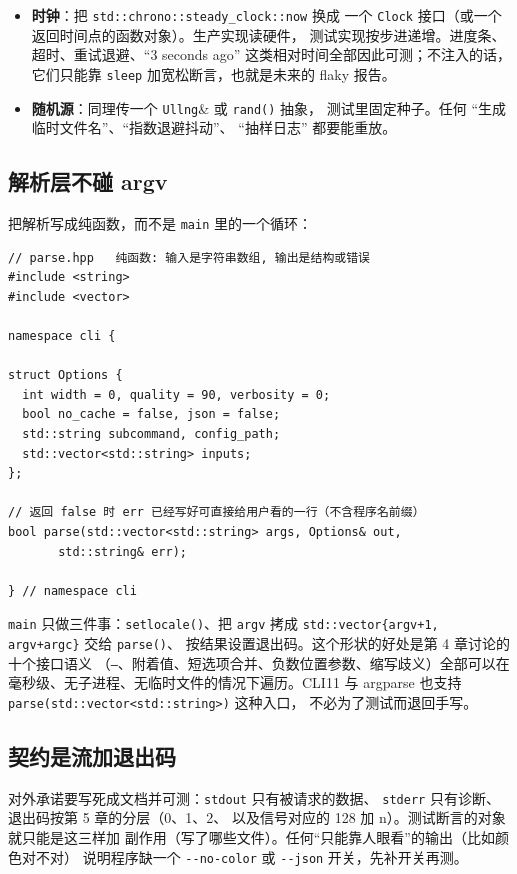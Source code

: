 \documentclass[12pt,a4paper,fontset=fandol]{ctexbook}
\newcommand{\Fn}[1]{\texttt{#1()}}
\newcommand{\Tp}[1]{\texttt{#1}}
\newcommand{\Opt}[1]{\texttt{-\/-#1}}
\newcommand{\Bk}{\allowbreak}
\begin{document}
\begin{itemize}
\item \textbf{时钟}：把 \Tp{std::chrono::steady\Bk\_clock::now} 换成
      一个 \Tp{Clock} 接口（或一个返回时间点的函数对象）。生产实现读硬件，
      测试实现按步进递增。进度条、超时、重试退避、``3 seconds ago''
      这类相对时间全部因此可测；不注入的话，它们只能靠
      \lstinline|sleep| 加宽松断言，也就是未来的 flaky 报告。
\item \textbf{随机源}：同理传一个 \Tp{Ullng}\& 或 \Fn{rand} 抽象，
      测试里固定种子。任何 ``生成临时文件名''、``指数退避抖动''、
      ``抽样日志'' 都要能重放。
\end{itemize}

\subsection{解析层不碰 argv}

把解析写成纯函数，而不是 \Tp{main} 里的一个循环：

\begin{lstlisting}[caption={解析入口的可测形状}]
// parse.hpp   纯函数: 输入是字符串数组, 输出是结构或错误
#include <string>
#include <vector>

namespace cli {

struct Options {
  int width = 0, quality = 90, verbosity = 0;
  bool no_cache = false, json = false;
  std::string subcommand, config_path;
  std::vector<std::string> inputs;
};

// 返回 false 时 err 已经写好可直接给用户看的一行（不含程序名前缀）
bool parse(std::vector<std::string> args, Options& out,
       std::string& err);

} // namespace cli
\end{lstlisting}

\Tp{main} 只做三件事：\Fn{setlocale}、把 \Tp{argv} 拷成
\Tp{std::vector\{argv+1, argv+argc\}} 交给 \Fn{parse}、
按结果设置退出码。这个形状的好处是第 4 章讨论的十个接口语义
（\Tp{--}、附着值、短选项合并、负数位置参数、缩写歧义）全部可以在
毫秒级、无子进程、无临时文件的情况下遍历。CLI11 与 argparse 也支持
\lstinline|parse(std::vector<std::string>)| 这种入口，
不必为了测试而退回手写。

\subsection{契约是流加退出码}

对外承诺要写死成文档并可测：\Tp{stdout} 只有被请求的数据、
\Tp{stderr} 只有诊断、退出码按第 5 章的分层（0、1、2、
以及信号对应的 128 加 n）。测试断言的对象就只能是这三样加
副作用（写了哪些文件）。任何``只能靠人眼看''的输出（比如颜色对不对）
说明程序缺一个 \Opt{no-color} 或 \Opt{json} 开关，先补开关再测。
\end{document}

